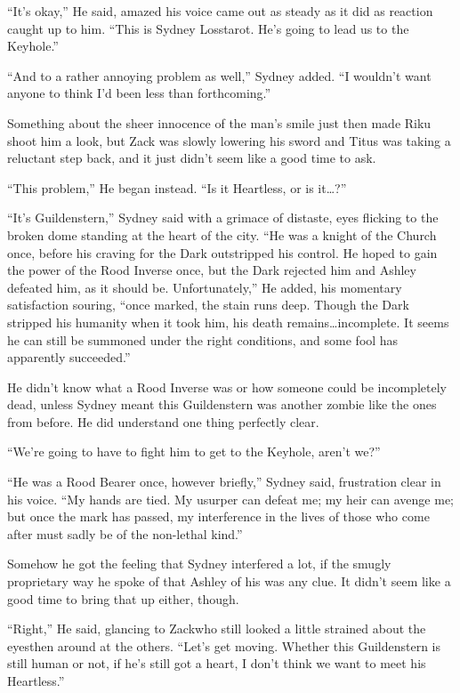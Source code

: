 ``It's okay,'' He said, amazed his voice came out as steady as it did as reaction caught up to him. ``This is Sydney Losstarot. He's going to lead us to the Keyhole.''

``And to a rather annoying problem as well,'' Sydney added. ``I wouldn't want anyone to think I'd been less than forthcoming.''

Something about the sheer innocence of the man's smile just then made Riku shoot him a look, but Zack was slowly lowering his sword and Titus was taking a reluctant step back, and it just didn't seem like a good time to ask.

``This problem,'' He began instead. ``Is it Heartless, or is it\ldots ?''

``It's Guildenstern,'' Sydney said with a grimace of distaste, eyes flicking to the broken dome standing at the heart of the city. ``He was a knight of the Church once, before his craving for the Dark outstripped his control. He hoped to gain the power of the Rood Inverse once, but the Dark rejected him and Ashley defeated him, as it should be. Unfortunately,'' He added, his momentary satisfaction souring, ``once marked, the stain runs deep. Though the Dark stripped his humanity when it took him, his death remains\ldots incomplete. It seems he can still be summoned under the right conditions, and some fool has apparently succeeded.''

He didn't know what a Rood Inverse was or how someone could be incompletely dead, unless Sydney meant this Guildenstern was another zombie like the ones from before. He did understand one thing perfectly clear.

``We're going to have to fight him to get to the Keyhole, aren't we?''

``He was a Rood Bearer once, however briefly,'' Sydney said, frustration clear in his voice. ``My hands are tied. My usurper can defeat me; my heir can avenge me; but once the mark has passed, my interference in the lives of those who come after must sadly be of the non-lethal kind.''

Somehow he got the feeling that Sydney interfered a lot, if the smugly proprietary way he spoke of that Ashley of his was any clue. It didn't seem like a good time to bring that up either, though.

``Right,'' He said, glancing to Zack\textemdash who still looked a little strained about the eyes\textemdash then around at the others. ``Let's get moving. Whether this Guildenstern is still human or not, if he's still got a heart, I don't think we want to meet his Heartless.''



